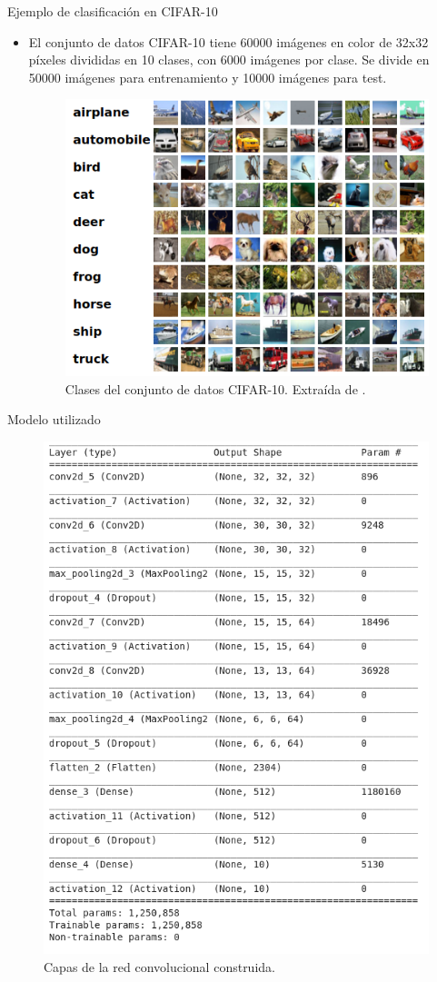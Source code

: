 \documentclass[spanish]{beamer}
\begin{document}
\begin{frame}{Ejemplo de clasificación en CIFAR-10}
\begin{itemize}
  \item El conjunto de datos CIFAR-10 tiene 60000 imágenes en color de 32x32 píxeles divididas en 10 clases, con 6000 imágenes por clase. Se divide en 50000 imágenes para entrenamiento y 10000 imágenes para test.
  \vspace{1em}
\begin{figure}[h]
  \centering
  \includegraphics[width=.5\textwidth]{img/cifar10}
  \caption{Clases del conjunto de datos CIFAR-10. Extraída de \parencite{rizhevsky_cifar_2013}.}
  \label{fig:cifar10}
\end{figure}

\end{itemize}

\end{frame}

\begin{frame}{Modelo utilizado}
\begin{figure}[h]
  \centering
  \includegraphics[width=.5\textwidth]{img/model}
  \caption{Capas de la red convolucional construida.}
  \label{fig:model}
\end{figure}
\end{frame}
\end{document}

